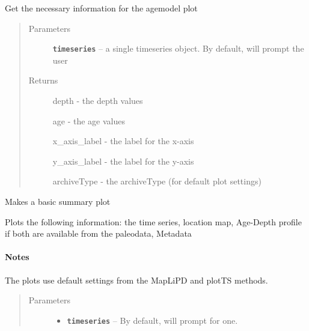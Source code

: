 \documentclass[letterpaper,10pt,english]{sphinxmanual}
\begin{document}
\begin{fulllineitems}
\begin{fulllineitems}
\end{fulllineitems}


\begin{fulllineitems}
\label{SummaryPlots:pyleoclim.SummaryPlots.agemodelData}
Get the necessary information for the agemodel plot
\begin{quote}\begin{description}
\item[{Parameters}] \leavevmode
\textbf{\texttt{timeseries}} -- a single timeseries object. By default, will
prompt the user

\item[{Returns}] \leavevmode

depth - the depth values

age - the age values

x\_axis\_label - the label for the x-axis

y\_axis\_label - the label for the y-axis

archiveType - the archiveType (for default plot settings)


\end{description}\end{quote}

\end{fulllineitems}


\begin{fulllineitems}
\label{SummaryPlots:pyleoclim.SummaryPlots.basic}
Makes a basic summary plot

Plots the following information: the time series, location map,
Age-Depth profile if both are available from the paleodata, Metadata
\paragraph{Notes}

The plots use default settings from the MapLiPD and plotTS methods.
\begin{quote}\begin{description}
\item[{Parameters}] \leavevmode\begin{itemize}
\item {} 
\textbf{\texttt{timeseries}} -- By default, will prompt for one.


\end{itemize}
\end{description}
\end{quote}
\end{fulllineitems}
\end{fulllineitems}
\end{document}
